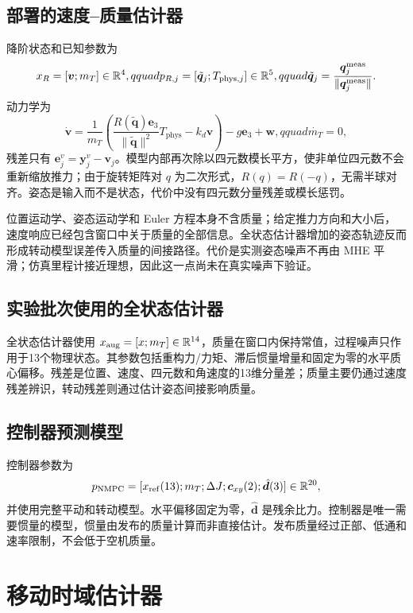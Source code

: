 \documentclass[11pt,UTF8,fontset=none]{ctexrep}
\providecommand{\dJ}{\Delta J}
\providecommand{\mT}{m_T}
\providecommand{\cvec}{\bm{c}_{xy}}
\providecommand{\Tphys}{T_{\mathrm{phys}}}
\providecommand{\ev}{\bm e_3}
\begin{document}
\subsection{部署的速度--质量估计器}

降阶状态和已知参数为
\begin{equation}
x_R=[\bm v;\mT]\in\mathbb R^4,qquad
p_{R,j}=[\tilde{\bm q}_j;T_{{\rm phys},j}]\in\mathbb R^5,qquad
\tilde{\bm q}_j=\frac{\bm q_j^{\rm meas}}{\|\bm q_j^{\rm meas}\|}.
\end{equation}
动力学为
\begin{equation}
\dot{\bm v}=\frac{1}{\mT}
\left(\frac{R(\tilde{\bm q})\ev}{\|\tilde{\bm q}\|^2}\Tphys-k_d\bm v\right)-g\ev+\bm w,qquad
\dot{\mT}=0,
\end{equation}
残差只有 $\bm e_j^v=\bm y_j^v-\bm v_j$。模型内部再次除以四元数模长平方，使非单位四元数不会重新缩放推力；由于旋转矩阵对 $q$ 为二次形式，$R(q)=R(-q)$，无需半球对齐。姿态是输入而不是状态，代价中没有四元数分量残差或模长惩罚。

位置运动学、姿态运动学和 Euler 方程本身不含质量；给定推力方向和大小后，速度响应已经包含窗口中关于质量的全部信息。全状态估计器增加的姿态轨迹反而形成转动模型误差传入质量的间接路径。代价是实测姿态噪声不再由 MHE 平滑；仿真里程计接近理想，因此这一点尚未在真实噪声下验证。

\subsection{实验批次使用的全状态估计器}

全状态估计器使用 $x_{\rm aug}=[x;\mT]\in\mathbb R^{14}$，质量在窗口内保持常值，过程噪声只作用于13个物理状态。其参数包括重构力/力矩、滞后惯量增量和固定为零的水平质心偏移。残差是位置、速度、四元数和角速度的13维分量差；质量主要仍通过速度残差辨识，转动残差则通过估计姿态间接影响质量。

\subsection{控制器预测模型}

控制器参数为
\begin{equation}
p_{\rm NMPC}=[x_{\rm ref}(13);\mT;\dJ;\cvec(2);\hat{\bm d}(3)]\in\mathbb R^{20},
\end{equation}
并使用完整平动和转动模型。水平偏移固定为零，$\hat{\bm d}$ 是残余比力。控制器是唯一需要惯量的模型，惯量由发布的质量计算而非直接估计。发布质量经过正部、低通和速率限制，不会低于空机质量。

\section{移动时域估计器}
\end{document}
